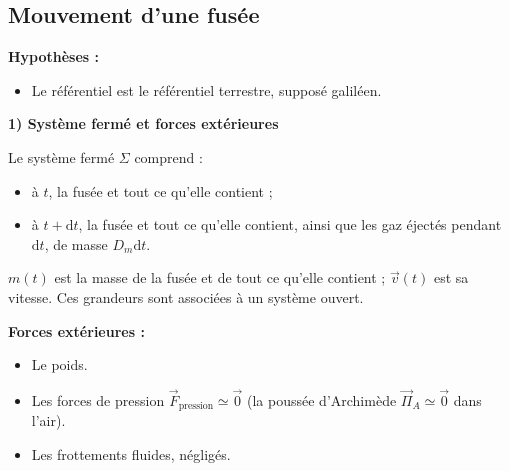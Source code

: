 \documentclass[11pt,a4paper]{article}
\newcommand{\dd}{\mathrm d}
\newcommand{\etape}[1]{\par\medskip\textbf{#1}\par\nopagebreak[4]}
\begin{document}
\subsection{Mouvement d'une fusée}
\begin{exemple}[breakable]
\begin{center}\end{center}
\par\textbf{Hypothèses :}
\begin{itemize}
\item Le référentiel est le référentiel terrestre, supposé galiléen.
\end{itemize}
\etape{1) Système fermé et forces extérieures}
Le système fermé $\Sigma$ comprend :
\begin{itemize}\item à $t$, la fusée et tout ce qu'elle contient ;\item à $t+\dd t$, la fusée et tout ce qu'elle contient, ainsi que les gaz éjectés pendant $\dd t$, de masse $D_m\dd t$.\end{itemize}
$m(t)$ est la masse de la fusée et de tout ce qu'elle contient ; $\vec v(t)$ est sa vitesse. Ces grandeurs sont associées à un système ouvert.
\par\par\par\medskip\noindent\begin{minipage}{\linewidth}
\textbf{Forces extérieures :}
\begin{itemize}
\item Le poids.
\item Les forces de pression $\vec F_{\mathrm{pression}}\simeq\vec0$ (la poussée d'Archimède $\vec\Pi_A\simeq\vec0$ dans l'air).
\item Les frottements fluides, négligés.

\end{itemize}
\end{minipage}
\end{exemple}
\end{document}
